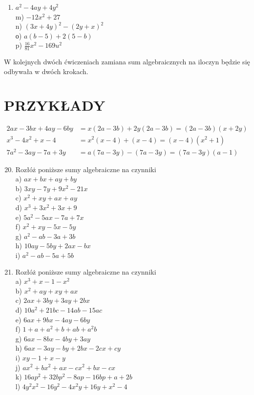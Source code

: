 \documentclass[10pt]{article}
\begin{document}
\begin{enumerate}
  \item \(a^{2}-4 a y+4 y^{2}\)\\
m) \(-12 x^{2}+27\)\\
n) \((3 x+4 y)^{2}-(2 y+x)^{2}\)\\
о) \(a(b-5)+2(5-b)\)\\
p) \(\frac{16}{81} x^{2}-169 u^{2}\)
\end{enumerate}

W kolejnych dwóch ćwiczeniach zamiana sum algebraicznych na iloczyn będzie się odbywała w dwóch krokach.

\section*{PRZYKŁADY}
\[
\begin{aligned}
2 a x-3 b x+4 a y-6 b y & =x(2 a-3 b)+2 y(2 a-3 b)=(2 a-3 b)(x+2 y) \\
x^{3}-4 x^{2}+x-4 & =x^{2}(x-4)+(x-4)=(x-4)\left(x^{2}+1\right) \\
7 a^{2}-3 a y-7 a+3 y & =a(7 a-3 y)-(7 a-3 y)=(7 a-3 y)(a-1)
\end{aligned}
\]

\begin{enumerate}
  \setcounter{enumi}{19}
  \item Rozłóż poniższe sumy algebraiczne na czynniki\\
a) \(a x+b x+a y+b y\)\\
b) \(3 x y-7 y+9 x^{2}-21 x\)\\
c) \(x^{2}+x y+a x+a y\)\\
d) \(x^{3}+3 x^{2}+3 x+9\)\\
e) \(5 a^{2}-5 a x-7 a+7 x\)\\
f) \(x^{2}+x y-5 x-5 y\)\\
g) \(a^{2}-a b-3 a+3 b\)\\
h) \(10 a y-5 b y+2 a x-b x\)\\
i) \(a^{2}-a b-5 a+5 b\)
  \item Rozłóż poniższe sumy algebraiczne na czynniki\\
a) \(x^{3}+x-1-x^{2}\)\\
b) \(x^{2}+a y+x y+a x\)\\
c) \(2 a x+3 b y+3 a y+2 b x\)\\
d) \(10 a^{2}+21 b c-14 a b-15 a c\)\\
e) \(6 a x+9 b x-4 a y-6 b y\)\\
f) \(1+a+a^{2}+b+a b+a^{2} b\)\\
g) \(6 a x-8 b x-4 b y+3 a y\)\\
h) \(6 a x-3 a y-b y+2 b x-2 c x+c y\)\\
i) \(x y-1+x-y\)\\
j) \(a x^{2}+b x^{2}+a x-c x^{2}+b x-c x\)\\
k) \(16 a p^{2}+32 b p^{2}-8 a p-16 b p+a+2 b\)\\
l) \(4 y^{2} x^{2}-16 y^{2}-4 x^{2} y+16 y+x^{2}-4\)
\end{enumerate}
\end{document}
